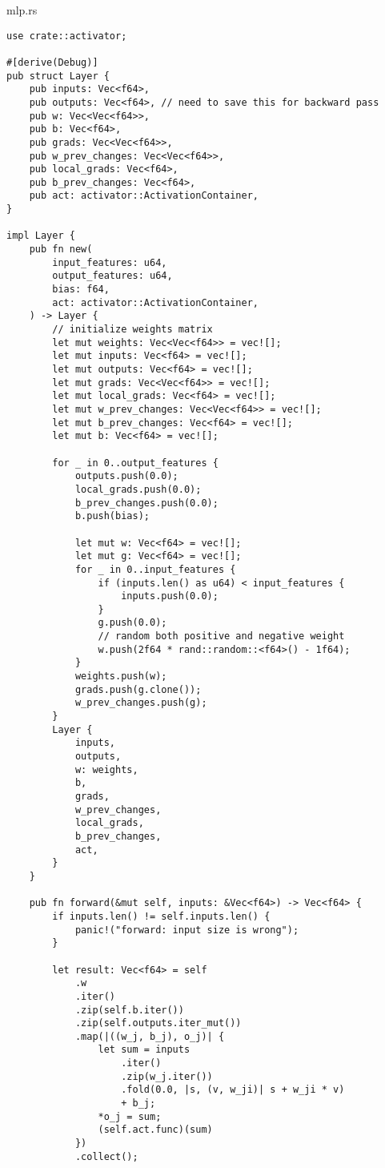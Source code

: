 \begin{code}
\caption{mlp.rs}
\begin{verbatim} 
use crate::activator;

#[derive(Debug)]
pub struct Layer {
    pub inputs: Vec<f64>,
    pub outputs: Vec<f64>, // need to save this for backward pass
    pub w: Vec<Vec<f64>>,
    pub b: Vec<f64>,
    pub grads: Vec<Vec<f64>>,
    pub w_prev_changes: Vec<Vec<f64>>,
    pub local_grads: Vec<f64>,
    pub b_prev_changes: Vec<f64>,
    pub act: activator::ActivationContainer,
}

impl Layer {
    pub fn new(
        input_features: u64,
        output_features: u64,
        bias: f64,
        act: activator::ActivationContainer,
    ) -> Layer {
        // initialize weights matrix
        let mut weights: Vec<Vec<f64>> = vec![];
        let mut inputs: Vec<f64> = vec![];
        let mut outputs: Vec<f64> = vec![];
        let mut grads: Vec<Vec<f64>> = vec![];
        let mut local_grads: Vec<f64> = vec![];
        let mut w_prev_changes: Vec<Vec<f64>> = vec![];
        let mut b_prev_changes: Vec<f64> = vec![];
        let mut b: Vec<f64> = vec![];

        for _ in 0..output_features {
            outputs.push(0.0);
            local_grads.push(0.0);
            b_prev_changes.push(0.0);
            b.push(bias);

            let mut w: Vec<f64> = vec![];
            let mut g: Vec<f64> = vec![];
            for _ in 0..input_features {
                if (inputs.len() as u64) < input_features {
                    inputs.push(0.0);
                }
                g.push(0.0);
                // random both positive and negative weight
                w.push(2f64 * rand::random::<f64>() - 1f64);
            }
            weights.push(w);
            grads.push(g.clone());
            w_prev_changes.push(g);
        }
        Layer {
            inputs,
            outputs,
            w: weights,
            b,
            grads,
            w_prev_changes,
            local_grads,
            b_prev_changes,
            act,
        }
    }

    pub fn forward(&mut self, inputs: &Vec<f64>) -> Vec<f64> {
        if inputs.len() != self.inputs.len() {
            panic!("forward: input size is wrong");
        }

        let result: Vec<f64> = self
            .w
            .iter()
            .zip(self.b.iter())
            .zip(self.outputs.iter_mut())
            .map(|((w_j, b_j), o_j)| {
                let sum = inputs
                    .iter()
                    .zip(w_j.iter())
                    .fold(0.0, |s, (v, w_ji)| s + w_ji * v)
                    + b_j;
                *o_j = sum;
                (self.act.func)(sum)
            })
            .collect();


\end{verbatim}
\end{code}
